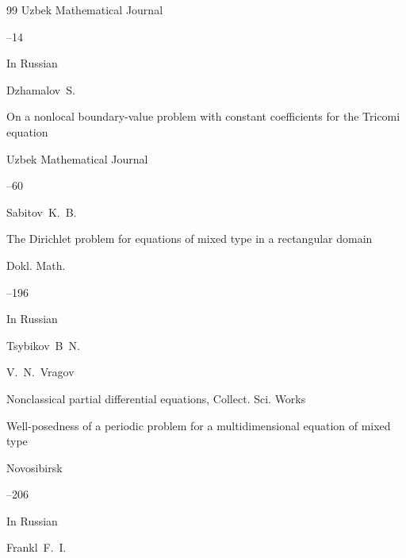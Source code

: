\begin{thebibliography}{99}
\jour Uzbek Mathematical Journal



--14




\lang In Russian

\by Dzhamalov~S.

\paper On a nonlocal boundary-value problem with constant coefficients for the Tricomi equation

\jour Uzbek Mathematical Journal



--60










\by Sabitov~K.~B.

\paper The Dirichlet problem for equations of mixed type in a rectangular domain

\jour  Dokl. Math. 




–196 





\lang In Russian

\by Tsybikov~B~N.

\ed V.~N.~Vragov

\inbook Nonclassical partial differential equations, Collect. Sci. Works

\paper  Well-posedness of a periodic problem for a multidimensional equation of mixed type

\publaddr Novosibirsk


--206








\lang In Russian

\by Frankl~F.~I.


\end{thebibliography}
